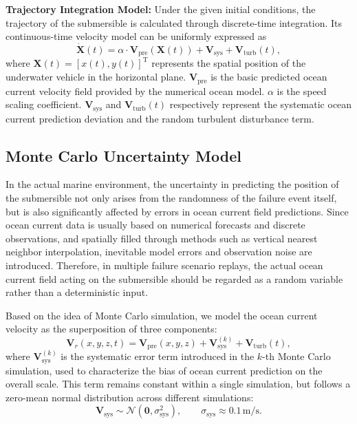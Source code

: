 \documentclass{mcmthesis}
\begin{document}
\vspace{0.5em}
\textbf{Trajectory Integration Model:}
Under the given initial conditions,
the trajectory of the submersible is calculated through discrete-time integration.
Its continuous-time velocity model can be uniformly expressed as
\begin{equation}
\dot{\mathbf{X}}(t)
=
\alpha \cdot \mathbf{V}_{\mathrm{pre}}(\mathbf{X}(t))
+
\mathbf{V}_{\mathrm{sys}}
+
\mathbf{V}_{\mathrm{turb}}(t),
\end{equation}
where
$\mathbf{X}(t) = [x(t),y(t)]^{\mathrm{T}}$ represents the spatial position of the underwater vehicle in the horizontal plane.
$\mathbf{V}_{\mathrm{pre}}$ is the basic predicted ocean current velocity field provided by the numerical ocean model.
$\alpha$ is the speed scaling coefficient.
$\mathbf{V}_{\mathrm{sys}}$ and $\mathbf{V}_{\mathrm{turb}}(t)$ respectively represent the systematic ocean current prediction deviation and the random turbulent disturbance term.

\vspace{0.5em}
\subsection{Monte Carlo Uncertainty Model}
In the actual marine environment,
the uncertainty in predicting the position of the submersible not only arises from the randomness of the failure event itself,
but is also significantly affected by errors in ocean current field predictions.
Since ocean current data is usually based on numerical forecasts and discrete observations,
and spatially filled through methods such as vertical nearest neighbor interpolation,
inevitable model errors and observation noise are introduced.
Therefore,
in multiple failure scenario replays,
the actual ocean current field acting on the submersible should be regarded as a random variable rather than a deterministic input.

Based on the idea of Monte Carlo simulation,
we model the ocean current velocity as the superposition of three components:
\begin{equation}
\mathbf{V}_r(x,y,z,t)
=
\mathbf{V}_{\mathrm{pre}}(x,y,z)
+
\mathbf{V}_{\mathrm{sys}}^{(k)}
+
\mathbf{V}_{\mathrm{turb}}(t),
\end{equation}
where
$\mathbf{V}_{\mathrm{sys}}^{(k)}$ is the systematic error term introduced in the $k$-th Monte Carlo simulation,
used to characterize the bias of ocean current prediction on the overall scale.
This term remains constant within a single simulation,
but follows a zero-mean normal distribution across different simulations:
\begin{equation}
\mathbf{V}_{\mathrm{sys}}
\sim
\mathcal{N}\!\left( \mathbf{0}, \sigma_{\mathrm{sys}}^{2} \right),
\qquad
\sigma_{\mathrm{sys}} \approx 0.1\,\mathrm{m/s}.
\end{equation}
\end{document}

